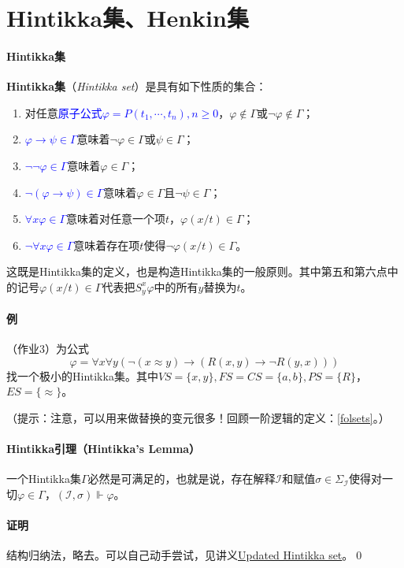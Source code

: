 \documentclass[b5paper,oneside]{ctexbook}
\newcommand{\Blue}[1]{\textcolor[named]{blue}{#1}}
\begin{document}
\section{Hintikka集、Henkin集}
\paragraph{Hintikka集}\textbf{Hintikka集}（\textit{Hintikka set}）是具有如下性质的集合：
\begin{enumerate}
\item 对任意\Blue{原子公式$\varphi=P(t_1,\cdots ,t_n),n\geq 0$}，$\varphi\not\in\Gamma$或$\neg\varphi\not\in\Gamma$；
\item \Blue{$\varphi\to\psi\in\Gamma$}意味着$\neg\varphi\in\Gamma$或$\psi\in\Gamma$；
\item \Blue{$\neg\neg\varphi\in\Gamma$}意味着$\varphi\in\Gamma$；
\item \Blue{$\neg(\varphi\to\psi)\in\Gamma$}意味着$\varphi\in\Gamma$且$\neg\psi\in\Gamma$；
\item \Blue{$\forall x\varphi\in\Gamma$}意味着对任意一个项$t$，$\varphi (x/t)\in\Gamma$；
\item \Blue{$\neg\forall x\varphi\in\Gamma$}意味着存在项$t$使得$\neg \varphi (x/t)\in\Gamma$。
\end{enumerate}
这既是Hintikka集的定义，也是构造Hintikka集的一般原则。其中第五和第六点中的记号$\varphi(x/t)\in \Gamma$代表把$S_y^x\varphi$中的所有$y$替换为$t$。
\paragraph{例}（作业3）为公式\[\varphi=\forall x\forall y(\neg(x\approx y)\rightarrow(R(x,y)\rightarrow\neg R(y,x)))\]
找一个极小的Hintikka集。其中$VS=\{x,y\}, FS=CS=\{a,b\}, PS=\{R\}$，$ES=\{\approx\}$。

（提示：注意，可以用来做替换的变元很多！回顾一阶逻辑的定义：\ref{folsets}。）
\paragraph{Hintikka引理（Hintikka's Lemma）}一个Hintikka集$\Gamma$必然是可满足的，也就是说，存在解释$\mathscr{I}$和赋值$\sigma\in\Sigma_\mathscr{I}$使得对一切$\varphi\in\Gamma$，$(\mathscr{I},\sigma)\Vdash\varphi$。
\paragraph{证明}结构归纳法，略去。可以自己动手尝试，见讲义\href{http://iscasmc.ios.ac.cn/DM2016/hintikka.pdf}{Updated Hintikka set}。\hfill\qed
\end{document}
